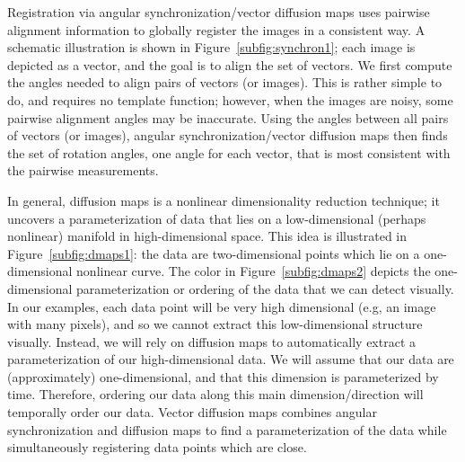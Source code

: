 \documentclass{pnastwo}
\begin{document}
\begin{article}
Registration via angular synchronization/vector diffusion maps uses pairwise alignment information to globally register the images in a consistent way.
%
A schematic illustration is shown in Figure~\ref{subfig:synchron1}; each image is depicted as a vector, and the goal is to align the set of vectors. 
%
We first compute the angles needed to align pairs of vectors (or images).
%
This is rather simple to do, and requires no template function; however, when the images are noisy, some pairwise alignment angles may be inaccurate.
%
Using the angles between all pairs of vectors (or images), angular synchronization/vector diffusion maps then finds the set of rotation angles, one angle for each vector, that is most consistent with the pairwise measurements.

In general, diffusion maps \cite{coifman2005geometric} is a nonlinear dimensionality reduction technique;
it uncovers a parameterization of data that lies on a low-dimensional (perhaps nonlinear) manifold in high-dimensional space. 
%
This idea is illustrated in Figure~\ref{subfig:dmaps1}: the data are two-dimensional points which lie on a one-dimensional nonlinear curve. 
%
The color in Figure~\ref{subfig:dmaps2} depicts the one-dimensional parameterization or ordering of the data that we can detect visually.
%
In our examples, each data point will be very high dimensional (e.g, an image with many pixels), and so we cannot extract this low-dimensional structure visually.
%
Instead, we will rely on diffusion maps to automatically extract a parameterization of our high-dimensional data.
%
We will assume that our data are (approximately) one-dimensional, and that this dimension is parameterized by time.
%
Therefore, ordering our data along this main dimension/direction will temporally order our data. 
%
Vector diffusion maps combines angular synchronization and diffusion maps to find a parameterization of the data while simultaneously registering data points which are close.


\end{article}
\end{document}
